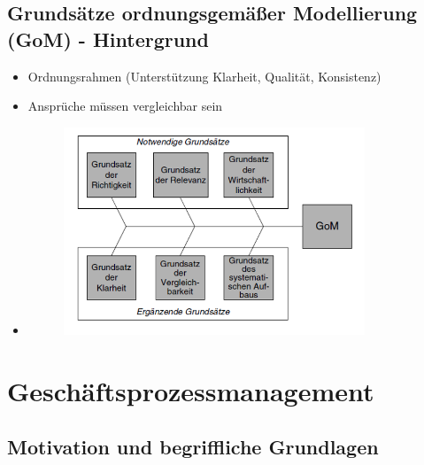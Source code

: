 \documentclass[11pt,a4paper]{article}
\begin{document}
\subsection{Grundsätze ordnungsgemäßer Modellierung (GoM) - Hintergrund}
\begin{itemize}
	
	\item Ordnungsrahmen (Unterstützung Klarheit, Qualität, Konsistenz)
	\item Ansprüche müssen vergleichbar sein
	\item[] 
	\begin{figure}[H]
	\centering
	\includegraphics[width=9cm]{gom}
	\end{figure}	
	
	
\end{itemize}

\section{Geschäftsprozessmanagement}
\subsection{Motivation und begriffliche Grundlagen}
\end{document}
